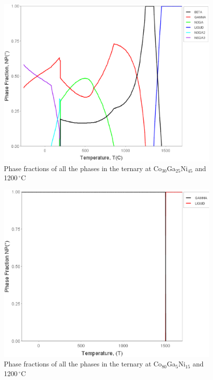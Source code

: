 \documentclass[article]{elsarticle}
\begin{document}
\begin{figure}
\centering
\includegraphics[scale=0.4]{np_ternary_Co30}
\caption{Phase fractions of all the phases in the ternary at Co$_{30}$Ga$_{25}$Ni$_{45}$ and 1200$\,^{\circ}\mathrm{C}$}
\label{NP_Co30}
\end{figure}
\begin{figure}
\centering
\includegraphics[scale=0.35]{np_ternary_Co80}
\caption{Phase fractions of all the phases in the ternary at Co$_{80}$Ga$_{5}$Ni$_{15}$ and 1200$\,^{\circ}\mathrm{C}$}
\label{NP_Co80}
\end{figure}
\end{document}
